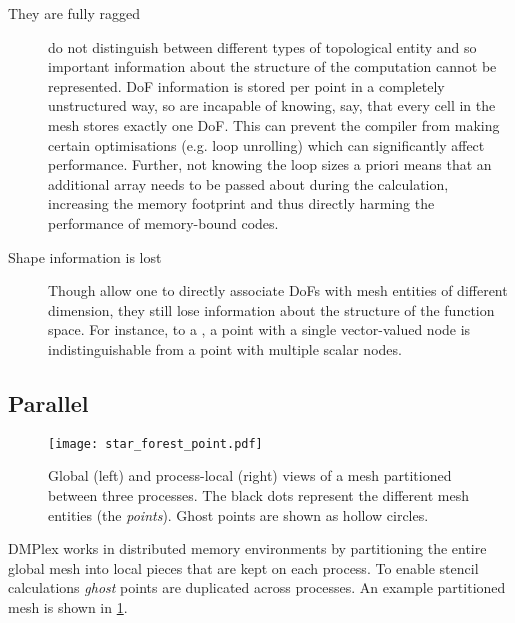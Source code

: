 \documentclass[thesis]{subfiles}
\begin{document}
\begin{description}
  \item[They are fully ragged]
     do not distinguish between different types of topological entity and so important information about the structure of the computation cannot be represented.
    DoF information is stored per point in a completely unstructured way, so  are incapable of knowing, say, that every cell in the mesh stores exactly one DoF.
    This can prevent the compiler from making certain optimisations (e.g. loop unrolling) which can significantly affect performance.
    Further, not knowing the loop sizes a priori means that an additional array needs to be passed about during the calculation, increasing the memory footprint and thus directly harming the performance of memory-bound codes.

  \item[Shape information is lost]
    Though  allow one to directly associate DoFs with mesh entities of different dimension, they still lose information about the structure of the function space.
    For instance, to a , a point with a single vector-valued node is indistinguishable from a point with multiple scalar nodes.
\end{description}

\subsection{Parallel}
\label{sec:dmplex_parallel}

\begin{figure}
  \centering
  \texttt{[image: star\_forest\_point.pdf]}
  \caption{
    Global (left) and process-local (right) views of a mesh partitioned between three processes.
    The black dots represent the different mesh entities (the \emph{points}).
    Ghost points are shown as hollow circles.
  }
  \label{fig:dmplex_split_mesh}
\end{figure}

DMPlex works in distributed memory environments by partitioning the entire global mesh into local pieces that are kept on each process.
To enable stencil calculations \emph{ghost} points are duplicated across processes.
An example partitioned mesh is shown in \cref{fig:dmplex_split_mesh}.
\end{document}
